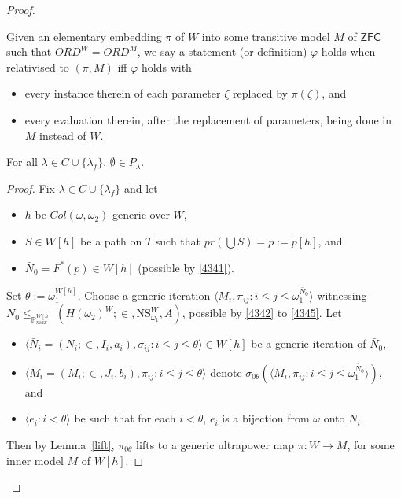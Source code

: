 \documentclass[12pt]{article}
\numberwithin{equation}{section}
\begin{document}
\begin{proof}
\begin{con}
Given an elementary embedding $\pi$ of $W$ into some transitive model $M$ of $\mathsf{ZFC}$ such that $ORD^W = ORD^M$, we say a statement (or definition) $\varphi$ holds when relativised to $(\pi, M)$ iff $\varphi$ holds with
\begin{itemize}
    \item every instance therein of each parameter $\zeta$ replaced by $\pi(\zeta)$, and
    \item every evaluation therein, after the replacement of parameters, being done in $M$ instead of $W$.
\end{itemize}
\end{con}

\begin{lem}\label{nonemp2}
For all $\lambda \in C \cup \{\lambda_f\}$, $\emptyset \in P_{\lambda}$.
\end{lem}

\begin{proof}
Fix $\lambda \in C \cup \{\lambda_f\}$ and let 
\begin{itemize}
    \item $h$ be $Col(\omega, \omega_2)$-generic over $W$,
    \item $S \in W[h]$ be a path on $T$ such that $pr(\bigcup S) = p := \dot{p}[h]$, and
    \item $\bar{N}_0 = F^*(p) \in W[h]$ (possible by \ref{4341}).
\end{itemize}
Set $\theta := \omega_1^{W[h]}$. Choose a generic iteration $\langle \bar{M}_i, \pi_{ij} : i \leq j \leq \omega_1^{\bar{N}_0} \rangle$ witnessing $\bar{N}_0 \leq_{\mathbb{P}^{W[h]}_{max}} (H(\omega_2)^W; \in, \mathrm{NS}_{\omega_1}^W, A)$, possible by \ref{4342} to \ref{4345}. Let 
\begin{itemize}
    \item $\langle \bar{N}_i = (N_i; \in, I_i, a_i), \sigma_{ij} : i \leq j \leq \theta \rangle \in W[h]$ be a generic iteration of $\bar{N}_0$,
    \item $\langle \bar{M}_i = (M_i; \in, J_i, b_i), \pi_{ij} : i \leq j \leq \theta \rangle$ denote $\sigma_{0\theta}(\langle \bar{M}_i, \pi_{ij} : i \leq j \leq \omega_1^{\bar{N}_0} \rangle)$, and
    \item $\langle e_i : i < \theta \rangle$ be such that for each $i < \theta$, $e_i$ is a bijection from $\omega$ onto $N_i$.
\end{itemize}
Then by Lemma~\ref{lift}, $\pi_{0\theta}$ lifts to a generic ultrapower map $\pi : W \longrightarrow M$, for some inner model $M$ of $W[h]$. 


\end{proof}
\end{proof}
\end{document}
